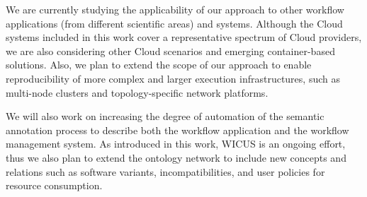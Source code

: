 We are currently studying the applicability of our approach to other 
workflow applications (from different scientific areas) and systems. Although
the Cloud systems included in this work cover a representative spectrum of 
Cloud providers, we are also considering other Cloud scenarios and 
emerging container-based solutions. Also, we plan to extend the scope of 
our approach to enable reproducibility of more complex and larger execution 
infrastructures, such as multi-node clusters and topology-specific network 
platforms.

We will also work on increasing  the degree of automation of the semantic annotation process to describe both the workflow application and the workflow management system. As introduced in this work, WICUS is an ongoing effort, thus we also plan to extend the ontology network to include new concepts and relations such as software variants, incompatibilities, and user policies for resource consumption.




